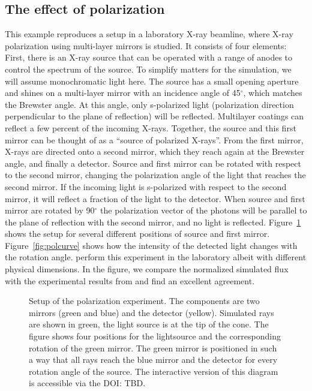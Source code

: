 \documentclass[twocolumn]{aastex61}
\begin{document}
\subsection{The effect of polarization}
This example reproduces a setup in a laboratory X-ray beamline, where
X-ray polarization using multi-layer mirrors is studied. It consists
of four elements: First, there is an X-ray source that can be operated
with a range of anodes to control the spectrum of the source. To
simplify matters for the simulation, we will assume monochromatic
light here. The source has a small opening aperture and shines on a
multi-layer mirror with an incidence angle of 45$^\circ$, which matches the 
Brewster angle. At this angle, only s-polarized light (polarization direction
perpendicular to the plane of reflection) will be
reflected. Multilayer coatings can reflect a few percent of the
incoming X-rays. Together, the source and this first mirror can be
thought of as a ``source of polarized X-rays''. From the first mirror,
X-rays are directed onto a second mirror, which they reach again at the
Brewster angle, and finally a detector. Source and first mirror can be
rotated with respect to the second mirror, changing the
polarization angle of the light that reaches the second mirror. If the
incoming light is s-polarized with respect to the second mirror, it
will reflect a fraction of the light to the detector. When source and
first mirror are rotated by 90$^\circ$ the polarization vector of the
photons will be parallel to the plane of reflection with the second
mirror, and no light is reflected. Figure~\ref{fig:3dpol} shows the
setup for several different positions of source and first
mirror. Figure~\ref{fig:polcurve} shows how the intensity of the
detected light changes with the rotation angle. \citet{2013SPIE.8861E..1DM} perform this experiment in the laboratory albeit with different physical dimensions. In the figure, we compare the normalized simulated flux with the experimental results from \citet{2013SPIE.8861E..1DM} and find an excellent agreement.

\begin{figure}[ht!]
\caption{Setup of the polarization experiment. The components are two
  mirrors (green and blue) and the detector (yellow). Simulated rays
  are shown in green, the light source is at the tip of the cone.
  The figure shows four
  positions for the lightsource and the corresponding rotation of the
  green mirror. The green mirror is positioned in such a way that all
  rays reach the blue mirror and the detector for every rotation angle
  of the source.  The interactive version of this diagram is
  accessible via the DOI: TBD.}
    \label{fig:3dpol}
\end{figure}
\end{document}
